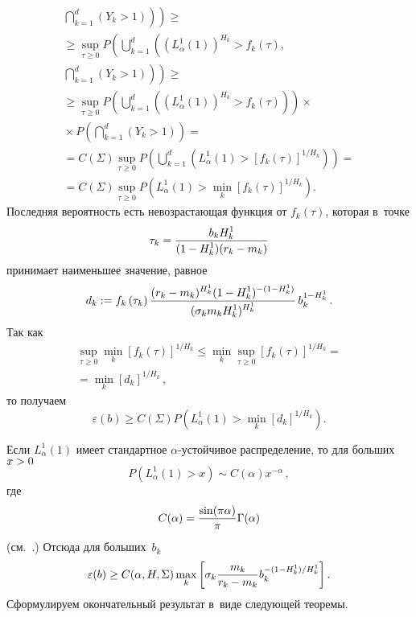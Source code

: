 \begin{multicols}{2}
\noindent
\begin{multline*}
\left.\left.\bigcap\limits_{k=1}^d (Y_k > 1) \right)\right) \geq {}\\
{}\geq
\sup\limits_{\tau\geq 0} P\left(\bigcup\limits_{k=1}^d \left(  
\left( L_{\alpha}^1 (1) \right)^{H_k}  > f_k (\tau ) , \right.\right.\\
\left.\left.\bigcap\limits_{k=1}^d \left(Y_k > 1\right) \right)\right) \geq{}
\\
{}\geq \sup\limits_{\tau\geq 0} P\left(\bigcup\limits_{k=1}^d \left( 
\left ( L_{\alpha}^1 (1) \right)^{H_k}  > f_k (\tau ) \right)\right)\times{}
\\
{}\times
P\left( \bigcap\limits_{k=1}^d (Y_k > 1)  \right) ={}
\\
{}= C(\Sigma )  \sup\limits_{\tau\geq 0} P\left(\bigcup\limits_{k=1}^d \left(   
L_{\alpha}^1 (1)   > [f_k (\tau ) ]^{1/H_k }  \right)\right) ={}\\
{}= 
C(\Sigma ) \sup\limits_{\tau\geq 0} P\left( L_{\alpha}^1 (1)
> \min\limits_k [f_k (\tau ) ]^{1/H_k }  \right).
\end{multline*}
Последняя вероятность есть невозрастающая функция от $f_k (\tau )$,
которая в~точке
$$
\tau_k = \displaystyle\frac{\displaystyle b_k H_k^1\mathstrut}{\displaystyle (1-H_k^1 )(r_k - m_k )\mathstrut}
$$
принимает наименьшее значение, равное
$$
d_k := f_k \left(\tau_k \right) 
\displaystyle\frac{\displaystyle (r_k - m_k )^{H_k^1} (1-H_k^1 )^{-(1-H_k^1 )} \mathstrut}{\displaystyle (\sigma_k m_k H_k^1 )^{H_k^1} \mathstrut} \, b_k^{1-H_k^1} \,.
$$
Так как
\begin{multline*}
\sup\limits_{\tau\geq 0} \min\limits_k \left[f_k (\tau )\right]^{1/H_k} \leq
\min\limits_k \sup\limits_{\tau\geq 0} 
\left [f_k (\tau )\right]^{1/H_k} ={}\\
{}= \min\limits_k \left[d_k \right]^{1/H_k } \,,
\end{multline*}
то получаем
$$
\varepsilon (b) \geq C(\Sigma )  P\left( L_{\alpha}^1 (1)   > \min\limits_k [d_k ]^{1/H_k }  \right)  .
$$



Если $L_{\alpha}^1 (1)$ имеет стандартное $\alpha$-устой\-чи\-вое распределение, 
то для больших $x\hm>0$
$$
 P(L_{\alpha}^1 (1) > x ) \sim C(\alpha ) x^{-\alpha} \,,
$$
где
$$
C(\alpha ) = \displaystyle\frac{\displaystyle \sin (\pi\alpha )\mathstrut}{\displaystyle \pi\mathstrut} \Gamma (\alpha ) 
$$
(см.\ \cite[теорема~2.4.1]{IL65}.) Отсюда для больших~$b_k$
$$
\varepsilon (b) \geq C(\alpha , H, \Sigma )  \max\limits_k \left[ \sigma_k 
\displaystyle\frac{\displaystyle m_k\mathstrut}{\displaystyle r_k - m_k\mathstrut} b_k^{-(1-H_k^1 )/H_k^1 } \right] .
$$
Сформулируем окончательный результат в~виде следующей теоремы.

\smallskip


\end{multicols}
